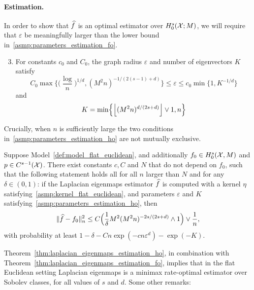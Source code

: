 \paragraph{Estimation.}
In order to show that $\widehat{f}$ is an optimal estimator over $H_0^s(\mathcal{X};M)$, we will require that $\varepsilon$ be meaningfully larger than the lower bound in~\ref{asmp:parameters_estimation_fo}.
\begin{enumerate}[label=(P\arabic*)]
	\setcounter{enumi}{2}
	\item 
	\label{asmp:parameters_estimation_ho}
	For constants $c_0$ and $C_0$, the graph radius $\varepsilon$ and number of eigenvectors $K$ satisfy
	\begin{equation}
	\label{eqn:radius_ho}
	C_0\max\biggl\{\biggl(\frac{\log}{n}\biggr)^{1/d}, (M^2n)^{-1/(2(s - 1) + d)}\biggr\} \leq \varepsilon \leq c_0\min\{1, K^{-1/d}\}
	\end{equation}
	and
	\begin{equation*}
	K = \min\Bigl\{\left\lfloor (M^2n)^{d/(2s + d)} \right\rfloor \vee 1,n\Bigr\}
	\end{equation*}
\end{enumerate}
Crucially, when $n$ is sufficiently large the two conditions in~\ref{asmp:parameters_estimation_ho} are not mutually exclusive.
\begin{theorem}
	\label{thm:laplacian_eigenmaps_estimation_ho}
	Suppose Model~\ref{def:model_flat_euclidean}, and additionally $f_0 \in H_0^s(\mathcal{X},M)$ and $p \in C^{s - 1}(\mathcal{X})$. There exist constants $c,C$ and $N$ that do not depend on $f_0$, such that the following statement holds all for all $n$ larger than $N$ and for any $\delta \in (0,1)$: if the Laplacian eigenmaps estimator $\widehat{f}$ is computed with a kernel $\eta$ satisfying~\ref{asmp:kernel_flat_euclidean}, and parameters $\varepsilon$ and $K$ satisfying~\ref{asmp:parameters_estimation_ho}, then
	\begin{equation}
	\label{eqn:laplacian_eigenmaps_estimation_ho}
	\|\widehat{f} - f_0\|_n^2 \leq C\Bigl(\frac{1}{\delta}M^2(M^2n)^{-2s/(2s + d)} \wedge 1\Bigr) \vee \frac{1}{n},
	\end{equation}
	with probability at least $1 - \delta - Cn\exp(-cn\varepsilon^d) - \exp(-K)$.
\end{theorem}
Theorem~\ref{thm:laplacian_eigenmaps_estimation_ho}, in combination with Theorem~\ref{thm:laplacian_eigenmaps_estimation_fo}, implies that in the flat Euclidean setting Laplacian eigenmaps is a minimax rate-optimal estimator over Sobolev classes, for all values of $s$ and $d$. Some other remarks:
